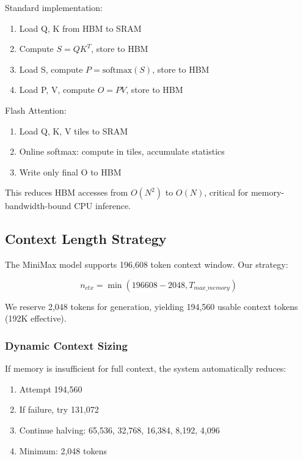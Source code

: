 Standard implementation:
\begin{enumerate}
    \item Load Q, K from HBM to SRAM
    \item Compute $S = QK^T$, store to HBM
    \item Load S, compute $P = \text{softmax}(S)$, store to HBM
    \item Load P, V, compute $O = PV$, store to HBM
\end{enumerate}

Flash Attention:
\begin{enumerate}
    \item Load Q, K, V tiles to SRAM
    \item Online softmax: compute in tiles, accumulate statistics
    \item Write only final O to HBM
\end{enumerate}

This reduces HBM accesses from $O(N^2)$ to $O(N)$, critical for memory-bandwidth-bound CPU inference.

\subsection{Context Length Strategy}

The MiniMax model supports 196,608 token context window. Our strategy:

\begin{equation}
n_{ctx} = \min(196608 - 2048, T_{max\_memory})
\end{equation}

We reserve 2,048 tokens for generation, yielding 194,560 usable context tokens (192K effective).

\subsubsection{Dynamic Context Sizing}

If memory is insufficient for full context, the system automatically reduces:

\begin{enumerate}
    \item Attempt 194,560
    \item If failure, try 131,072
    \item Continue halving: 65,536, 32,768, 16,384, 8,192, 4,096
    \item Minimum: 2,048 tokens
\end{enumerate}

